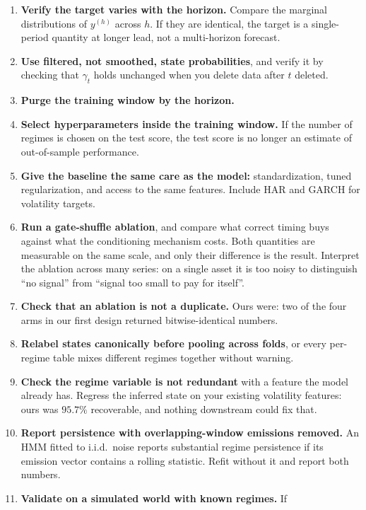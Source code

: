\documentclass[sigconf,nonacm]{acmart}
\begin{document}
\begin{enumerate}
  \item \textbf{Verify the target varies with the horizon.} Compare the marginal
    distributions of $y^{(h)}$ across $h$. If they are identical, the target is
    a single-period quantity at longer lead, not a multi-horizon forecast.
  \item \textbf{Use filtered, not smoothed, state probabilities}, and verify it
    by checking that $\gamma_t$ holds unchanged when you delete data after $t$
    deleted.
  \item \textbf{Purge the training window by the horizon.}
  \item \textbf{Select hyperparameters inside the training window.} If the
    number of regimes is chosen on the test score, the test score is no longer
    an estimate of out-of-sample performance.
  \item \textbf{Give the baseline the same care as the model:} standardization,
    tuned regularization, and access to the same features. Include HAR and
    GARCH for volatility targets.
  \item \textbf{Run a gate-shuffle ablation}, and compare what correct timing
    buys against what the conditioning mechanism costs. Both quantities are
    measurable on the same scale, and only their difference is the result.
    Interpret the ablation across many series: on a single asset it is too noisy
    to distinguish ``no signal'' from ``signal too small to pay for itself''.
  \item \textbf{Check that an ablation is not a duplicate.} Ours were: two of the
    four arms in our first design returned bitwise-identical numbers.
  \item \textbf{Relabel states canonically before pooling across folds}, or every
    per-regime table mixes different regimes together without warning.
  \item \textbf{Check the regime variable is not redundant} with a feature the
    model already has. Regress the inferred state on your existing volatility
    features: ours was $95.7\%$ recoverable, and nothing downstream could fix
    that.
  \item \textbf{Report persistence with overlapping-window emissions removed.}
    An HMM fitted to i.i.d.\ noise reports substantial regime persistence if its
    emission vector contains a rolling statistic. Refit without it and report
    both numbers.
  \item \textbf{Validate on a simulated world with known regimes.} If

\end{enumerate}
\end{document}
